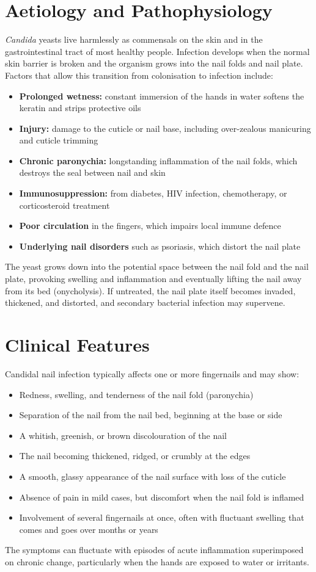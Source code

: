 \section*{Aetiology and Pathophysiology}
\textit{Candida} yeasts live harmlessly as commensals on the skin and in the gastrointestinal tract of most healthy people. Infection develops when the normal skin barrier is broken and the organism grows into the nail folds and nail plate. Factors that allow this transition from colonisation to infection include:
\begin{itemize}
    \item \textbf{Prolonged wetness:} constant immersion of the hands in water softens the keratin and strips protective oils
    \item \textbf{Injury:} damage to the cuticle or nail base, including over-zealous manicuring and cuticle trimming
    \item \textbf{Chronic paronychia:} longstanding inflammation of the nail folds, which destroys the seal between nail and skin
    \item \textbf{Immunosuppression:} from diabetes, HIV infection, chemotherapy, or corticosteroid treatment
    \item \textbf{Poor circulation} in the fingers, which impairs local immune defence
    \item \textbf{Underlying nail disorders} such as psoriasis, which distort the nail plate
\end{itemize}
The yeast grows down into the potential space between the nail fold and the nail plate, provoking swelling and inflammation and eventually lifting the nail away from its bed (onycholysis). If untreated, the nail plate itself becomes invaded, thickened, and distorted, and secondary bacterial infection may supervene.

\section*{Clinical Features}
Candidal nail infection typically affects one or more fingernails and may show:
\begin{itemize}
    \item Redness, swelling, and tenderness of the nail fold (paronychia)
    \item Separation of the nail from the nail bed, beginning at the base or side
    \item A whitish, greenish, or brown discolouration of the nail
    \item The nail becoming thickened, ridged, or crumbly at the edges
    \item A smooth, glassy appearance of the nail surface with loss of the cuticle
    \item Absence of pain in mild cases, but discomfort when the nail fold is inflamed
    \item Involvement of several fingernails at once, often with fluctuant swelling that comes and goes over months or years
\end{itemize}
The symptoms can fluctuate with episodes of acute inflammation superimposed on chronic change, particularly when the hands are exposed to water or irritants.

